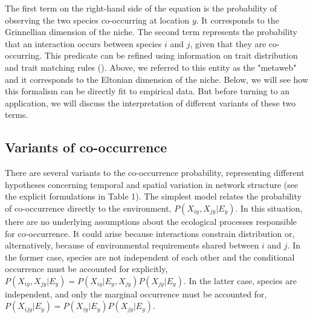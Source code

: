 \documentclass[12pt]{article}
\begin{document}
The first term on the right-hand side of the equation is the probability
of observing the two species co-occurring at location $y$. It corresponds
to the Grinnellian dimension of the niche. The second term represents the
probability that an interaction occurs between species $i$ and $j$, given that
they are co-occurring. This predicate can be refined using information on
trait distribution and trait matching rules (\citep{Bartomeus2016}).
Above, we referred to this entity as the "metaweb" and it corresponds to
the Eltonian dimension of the niche. Below, we will see how this formalism
can be directly fit to empirical data. But before turning to an application,
we will discuss the interpretation of different variants of these two terms.

\subsection*{Variants of co-occurrence}

There are several variants to the co-occurrence probability, representing
different hypotheses concerning temporal and spatial variation in network structure
(see the explicit formulations in Table 1). The simplest model relates the
probability of co-occurrence directly to the environment, $P(X_{iy},X_{jy}|E_y)$.
In this situation, there are no underlying assumptions about the ecological
processes responsible for co-occurrence. It could arise because interactions
constrain distribution \citep{Pollock2014, Cazelles2016} or,
alternatively, because of environmental requirements shared between $i$ and
$j$. In the former case, species are not independent of each other and the
conditional occurrence must be accounted for explicitly, $P(X_{iy},X_{jy}
|E_y)=P(X_{iy}|E_y,X_{jy})P(X_{jy}|E_y)$. In the latter case, species are
independent, and only the marginal occurrence must be accounted for, $P(
X_{ijy}|E_y)=P(X_{iy} |E_y)P(X_{jy} |E_y)$.
\end{document}
